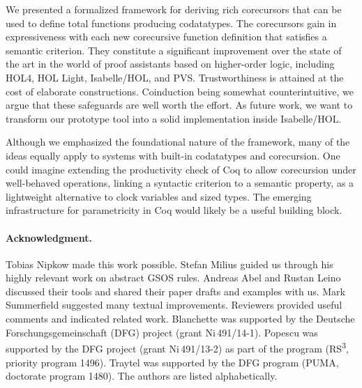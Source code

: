 \documentclass[preprint,draft]
{sigplanconf}
\newcommand{\<}{\langle}
\renewcommand{\>}{\rangle}
\begin{document}
We presented a formalized framework for deriving rich corecursors that can be used to
define total functions producing codatatypes. The corecursors gain in
expressiveness with each new corecursive function definition that satisfies a
semantic criterion. They constitute a significant improvement over the state of
the art in the world of proof assistants based on higher-order logic,
including HOL4, HOL Light, Isabelle\slash HOL, and PVS.
Trustworthiness is attained at the cost of elaborate constructions.
Coinduction being somewhat counterintuitive,
we argue that these safeguards are well worth the effort.
As future work, we want
to transform our prototype tool into a solid implementation inside
Isabelle\slash HOL. 



Although we emphasized the foundational nature of the framework, many of the
ideas equally apply to systems with built-in codatatypes and
corecursion. One could imagine extending the productivity check of
Coq to allow corecursion under well-behaved operations, linking a syntactic
criterion to a semantic property, as a lightweight alternative to
clock variables and sized types. The emerging infrastructure
for parametricity in Coq \cite{bernardy-et-al-2012-param,keller-lasson-2012}
would likely be a useful building block.








\paragraph{Acknowledgment.}
Tobias Nipkow made this work possible.
Stefan Milius guided us through his highly relevant work on abstract GSOS rules.
Andreas Abel and Rustan Leino discussed their tools and shared
their paper drafts and examples with us.
Mark Summer\-field suggested many textual improvements.
Reviewers provided useful comments and indicated related work.
Blanchette was supported by the Deutsche
Forschungs\-gemein\-schaft (DFG) project  (grant
Ni\,491\slash 14-1).
Popescu was supported by the DFG project
 (grant Ni\allowbreak\,491\slash 13-2) as part
of the program  (RS\textsuperscript{3},
priority program 1496).
Traytel was supported by the DFG program 
(PUMA, doctorate program 1480).
 The authors are listed alphabetically.


\begin{raggedright}
\small

\end{raggedright}
\end{document}
